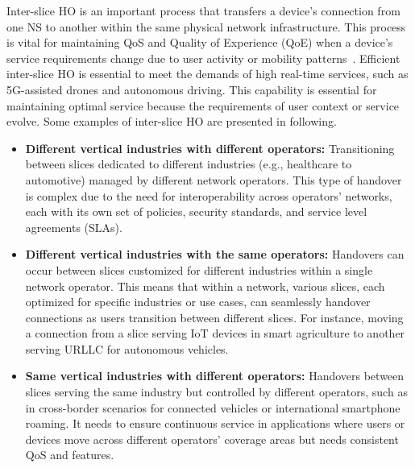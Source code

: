 \documentclass[graybox]{svmult}
\begin{document}
Inter-slice HO is an important process that transfers a device's connection from one NS to another within the same physical network infrastructure. This process is vital for maintaining QoS and Quality of Experience (QoE) when a device's service requirements change due to user activity or mobility patterns~\cite{ren2021fast, sajjad2022inter}. Efficient inter-slice HO is essential to meet the demands of high real-time services, such as 5G-assisted drones and autonomous driving. This capability is essential for maintaining optimal service because the requirements of user context or service evolve. Some examples of inter-slice HO are presented in following. 
\begin{itemize}
\item \textbf{Different vertical industries with different operators:}  Transitioning between slices dedicated to different industries (e.g., healthcare to automotive) managed by different network operators. This type of handover is complex due to the need for interoperability across operators' networks, each with its own set of policies, security standards, and service level agreements (SLAs).  
\item \textbf{Different vertical industries with the same operators:} Handovers can occur between slices customized for different industries within a single network operator. This means that within a network, various slices, each optimized for specific industries or use cases, can seamlessly handover connections as users transition between different slices. For instance, moving a connection from a slice serving IoT devices in smart agriculture to another serving URLLC for autonomous vehicles.
\item \textbf{Same vertical industries with different operators:} Handovers between slices serving the same industry but controlled by different operators, such as in cross-border scenarios for connected vehicles or international smartphone roaming. It needs to ensure continuous service in applications where users or devices move across different operators' coverage areas but needs consistent QoS and features.
\end{itemize}






\end{document}
